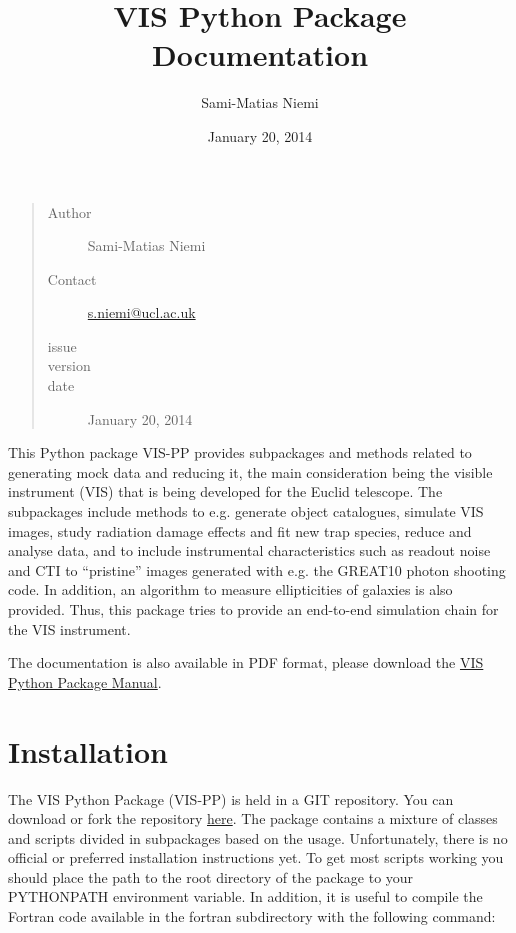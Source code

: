 \documentclass[a4paper,11pt,english]{sphinxmanual}
\title{VIS Python Package Documentation}
\date{January 20, 2014}
\author{Sami-Matias Niemi}
\begin{document}
\maketitle
\tableofcontents
{}\label{index::doc}

\begin{quote}\begin{description}
\item[{Author}] \leavevmode
Sami-Matias Niemi

\item[{Contact}] \leavevmode
\href{mailto:s.niemi@ucl.ac.uk}{s.niemi@ucl.ac.uk}

\item[{issue}] 

\item[{version}] 

\item[{date}] \leavevmode
January 20, 2014

\end{description}\end{quote}

This Python package VIS-PP provides subpackages and methods related to generating mock data and reducing it, the main
consideration being the visible instrument (VIS) that is being developed for the Euclid telescope.
The subpackages include methods to e.g. generate object catalogues, simulate VIS images,
study radiation damage effects and fit new trap species, reduce and analyse data, and to include instrumental
characteristics such as readout noise and CTI to ``pristine'' images generated with e.g. the GREAT10 photon
shooting code. In addition, an algorithm to measure ellipticities of galaxies is also provided. Thus,
this package tries to provide an end-to-end simulation chain for the VIS instrument.

The documentation is also available in PDF format, please download the \href{https://www.mssl.ucl.ac.uk/~smn2/Manual.pdf}{VIS Python Package Manual}.


\chapter{Installation}
\label{index:welcome-to-euclid-visible-instrument-vis-python-package-vis-pp-documentation}\label{index:installation}
The VIS Python Package (VIS-PP) is held in a GIT repository. You can download or fork the repository
\href{https://bitbucket.org/niemi/vissim-python/overview}{here}. The package contains a mixture of classes
and scripts divided in subpackages based on the usage. Unfortunately, there is no official or preferred
installation instructions yet. To get most scripts working you should place
the path to the root directory of the package to your PYTHONPATH environment variable. In addition, it is
useful to compile the Fortran code available in the fortran subdirectory with the following command:
\end{document}

